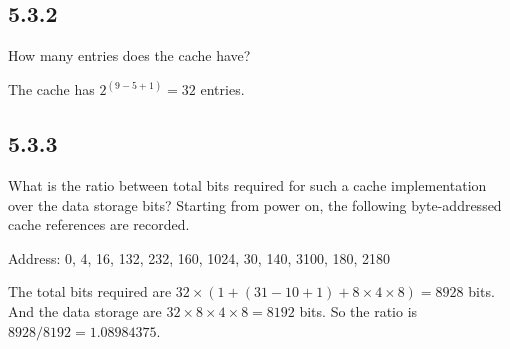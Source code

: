\documentclass[paper=a4, fontsize=11pt]{scrartcl} %
\begin{document}

\subsection{5.3.2} %
\label{sub:5_3_2}
\begin{fancyquotes}
    How many entries does the cache have?
\end{fancyquotes}

The cache has $2^{(9-5+1)}=32$ entries.


\subsection{5.3.3} %
\label{sub:5_3_3}
\begin{fancyquotes}
    What is the ratio between total bits required for such a cache implementation over the data storage bits?
    Starting from power on, the following byte-addressed cache references are recorded.

    Address: 0, 4, 16, 132, 232, 160, 1024, 30, 140, 3100, 180, 2180
\end{fancyquotes}

The total bits required are $32\times(1+(31-10+1)+8\times4\times8)=8928$ bits.
And the data storage are $32\times8\times4\times8=8192$ bits.
So the ratio is $8928/8192=1.08984375$.
\end{document}
